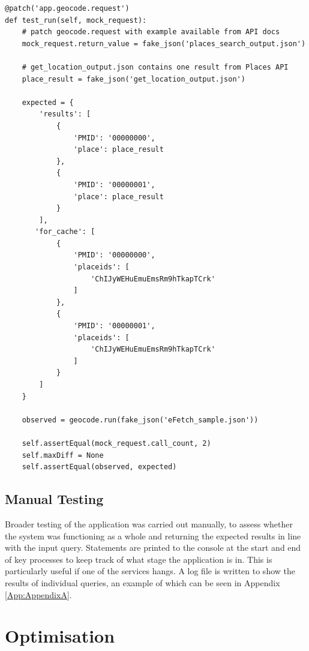 \documentclass[Report.tex]{subfiles}
\begin{document}
\begin{lstlisting}
@patch('app.geocode.request')
def test_run(self, mock_request):
    # patch geocode.request with example available from API docs
    mock_request.return_value = fake_json('places_search_output.json')

    # get_location_output.json contains one result from Places API
    place_result = fake_json('get_location_output.json')

    expected = {
        'results': [
            {
                'PMID': '00000000',
                'place': place_result
            },
            {
                'PMID': '00000001',
                'place': place_result
            }
        ],
       'for_cache': [
            {
                'PMID': '00000000',
                'placeids': [
                    'ChIJyWEHuEmuEmsRm9hTkapTCrk'
                ]
            },
            {
                'PMID': '00000001',
                'placeids': [
                    'ChIJyWEHuEmuEmsRm9hTkapTCrk'
                ]
            }
        ]
    }

    observed = geocode.run(fake_json('eFetch_sample.json'))
    
    self.assertEqual(mock_request.call_count, 2)
    self.maxDiff = None
    self.assertEqual(observed, expected)
\end{lstlisting}\newpage

\subsection{Manual Testing}
Broader testing of the application was carried out manually, to assess whether the system was functioning as a whole and returning the expected results in line with the input query. Statements are printed to the console at the start and end of key processes to keep track of what stage the application is in. This is particularly useful if one of the services hangs. A log file is written to show the results of individual queries, an example of which can be seen in Appendix \ref{App:AppendixA}. 

\section{Optimisation}
\end{document}

